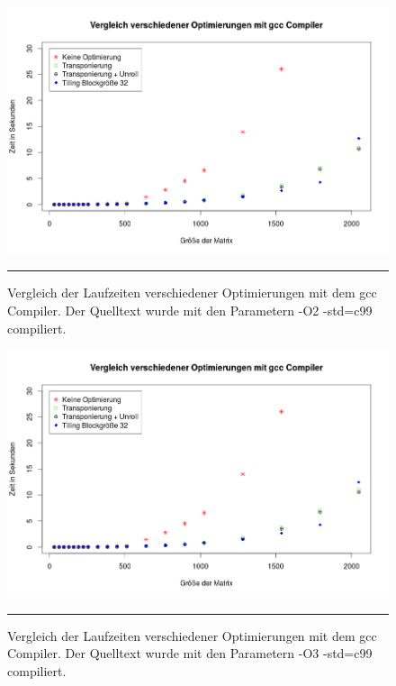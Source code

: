 \begin{figure}[h]
\includegraphics[scale = 0.45]{Bilder/gccO2.png}
\caption{Vergleich der Laufzeiten verschiedener Optimierungen mit dem gcc Compiler. Der Quelltext wurde mit den Parametern -O2 -std=c99 compiliert.}
\noindent\rule{14cm}{0.4pt}
\label{gccO2}
\end{figure}

\begin{figure}[h]
\includegraphics[scale = 0.45]{Bilder/gccO3.png}
\caption{Vergleich der Laufzeiten verschiedener Optimierungen mit dem gcc Compiler. Der Quelltext wurde mit den Parametern -O3 -std=c99 compiliert.}
\noindent\rule{14cm}{0.4pt}
\label{gccO3}
\end{figure}

